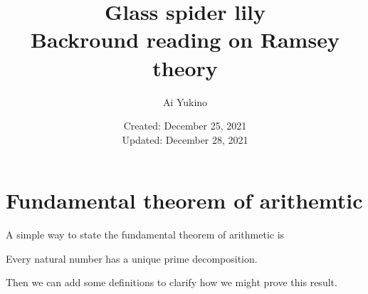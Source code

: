 \documentclass{article}
\begin{document}
\title{Glass spider lily\\
	\large Backround reading on Ramsey theory}
\author{Ai Yukino}
\date{Created: December 25, 2021\\
	\large Updated: December 28, 2021}
\maketitle
\hypersetup{linkcolor = internallinkcolor}
\tableofcontents
\hypersetup{linkcolor= .}

\section{Fundamental theorem of arithemtic}

A simple way to state the fundamental theorem of arithmetic is

\begin{theorem}\label{thm:arithmetic}
	Every natural number has a unique prime decomposition.
\end{theorem}

\noindent Then we can add some definitions to clarify how we might prove this result.
\end{document}
